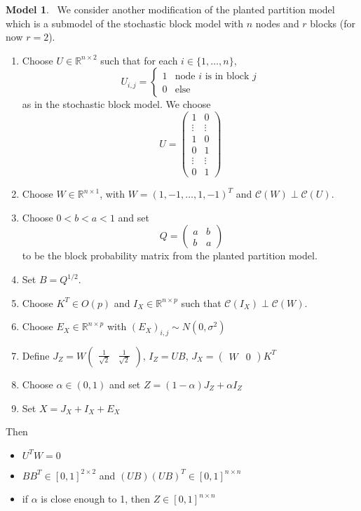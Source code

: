 \documentclass[notheorems]{beamer}
\theoremstyle{definition}
\newtheorem{modl}[model]{Model}
\newcommand{\al}{\alpha}
\newcommand{\sig}{\sigma}
\newcommand{\R}{\mathbb{R}}
\newcommand{\MC}{\mathcal{C}}
\begin{document}
\begin{frame}
\begin{modl}\
We consider another modification of the planted partition model which is a submodel of the stochastic block model with $n$ nodes and $r$ blocks (for now $r=2$).
\begin{enumerate}
    \item Choose $U \in \R^{n \times 2}$ such that for each $i \in \{1, \ldots, n\}$, 
    \[
    U_{i,j} = 
    \begin{cases}
    1 & \text{node $i$ is in block $j$} \\
    0 & \text{else}
    \end{cases}
    \] 
    as in the stochastic block model. We choose
    \[
    U = 
    \begin{pmatrix}
    1 & 0 \\
    \vdots & \vdots \\
    1 & 0 \\
    0 & 1 \\
    \vdots & \vdots \\
    0 & 1
    \end{pmatrix}
    \]
    \item Choose $W \in \R^{n \times 1}$, with $W = (1, -1, \ldots, 1, -1)^T$ and $\MC(W) \perp \MC(U)$. 
    \item Choose $0<b<a<1$ and set
    \[\
    Q = 
    \begin{pmatrix}
    a & b \\
    b & a
    \end{pmatrix}
    \]
    to be the block probability matrix from the planted partition model.
    \item Set $B = Q^{1/2}$.
    \item Choose $K^T \in O(p)$ and $I_X \in \R^{n \times p}$ such that $\MC(I_X) \perp \MC(W)$. 
    \item Choose $E_X \in \R^{n \times p}$ with $(E_X)_{i,j} \sim N(0, \sig^2)$
    \item Define $J_Z = W
    \begin{pmatrix}
    \frac{1}{\sqrt{2}} & \frac{1}{\sqrt{2}}
    \end{pmatrix}$, $I_Z = U B$, $J_X = 
    \begin{pmatrix}
    W & 0 
    \end{pmatrix}
    K^T$
     \item Choose $\alpha \in (0,1)$ and set $Z = (1 - \alpha) J_Z + \alpha I_Z$ 
    \item Set $X = 
     J_X + I_X + E_X$
\end{enumerate}
Then
\begin{itemize}
    \item $U^TW = 0$
    \item $BB^T \in [0,1]^{2 \times 2}$ and $(UB)(UB)^T \in [0,1]^{n \times n}$
    \item if $\al$ is close enough to 1, then $Z \in  [0,1]^{n \times n}$
    \end{itemize}
\end{modl}
\end{frame}
\end{document}

